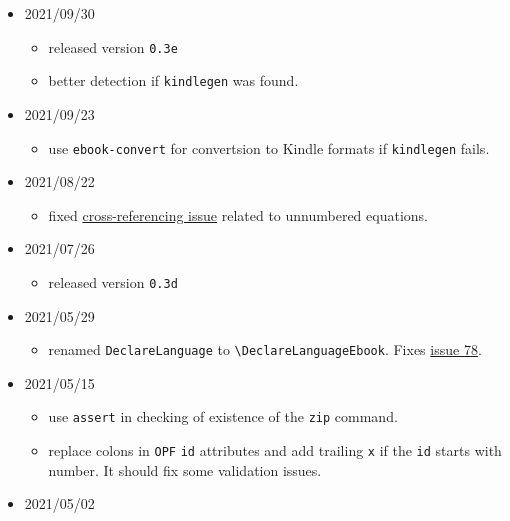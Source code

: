 \begin{itemize}
  \begin{itemize}
  \tightlist
  \item
    fix for \texttt{\textbackslash{}author} support in \texttt{amsart}
    class.
  \end{itemize}
\item
  2021/09/30

  \begin{itemize}
  \tightlist
  \item
    released version \texttt{0.3e}
  \item
    better detection if \texttt{kindlegen} was found.
  \end{itemize}
\item
  2021/09/23

  \begin{itemize}
  \tightlist
  \item
    use \texttt{ebook-convert} for convertsion to Kindle formats if
    \texttt{kindlegen} fails.
  \end{itemize}
\item
  2021/08/22

  \begin{itemize}
  \tightlist
  \item
    fixed
    \href{https://tex.stackexchange.com/a/611611/2891}{cross-referencing
    issue} related to unnumbered equations.
  \end{itemize}
\item
  2021/07/26

  \begin{itemize}
  \tightlist
  \item
    released version \texttt{0.3d}
  \end{itemize}
\item
  2021/05/29

  \begin{itemize}
  \tightlist
  \item
    renamed \texttt{DeclareLanguage} to
    \texttt{\textbackslash{}DeclareLanguageEbook}. Fixes
    \href{https://github.com/michal-h21/tex4ebook/issues/78}{issue 78}.
  \end{itemize}
\item
  2021/05/15

  \begin{itemize}
  \tightlist
  \item
    use \texttt{assert} in checking of existence of the \texttt{zip}
    command.
  \item
    replace colons in \texttt{OPF} \texttt{id} attributes and add
    trailing \texttt{x} if the \texttt{id} starts with number. It should
    fix some validation issues.
  \end{itemize}
\item
  2021/05/02


\end{itemize}

